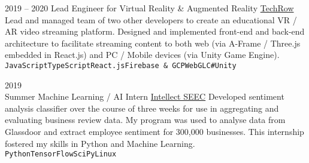 \documentclass[9pt]{developercv} %
\begin{document}
\begin{entrylist}
	\entry
	{2019 -- 2020}
	{Lead Engineer for Virtual Reality \& Augmented Reality}
	{\href{https://www.techrow.org}{TechRow}}
	{
		Lead and managed team of two other developers to create an educational VR / AR video streaming platform.
		Designed and implemented front-end and back-end architecture to facilitate streaming content to both web (via A-Frame / Three.js embedded in React.js) and PC / Mobile devices (via Unity Game Engine).
		\\
		\texttt{JavaScript}\slashsep\texttt{TypeScript}\slashsep\texttt{React.js}\slashsep\texttt{Firebase \& GCP}\slashsep\texttt{WebGL}\slashsep\texttt{C\#}\slashsep\texttt{Unity}
	}

	\entry
	{
		2019
		\\
		\footnotesize{Summer}
	}
	{Machine Learning / AI Intern}
	{\href{https://intellectseec.com}{Intellect SEEC}}
	{
		Developed sentiment analysis classifier over the course of three
		weeks for use in aggregating and evaluating business review data.
		My program was used to analyse data from Glassdoor and extract
		employee sentiment for 300,000 businesses. This internship fostered my skills in
		Python and Machine Learning.
		\\ \texttt{Python}\slashsep\texttt{TensorFlow}\slashsep\texttt{SciPy}\slashsep\texttt{Linux}
	}

\end{entrylist}
\end{document}
